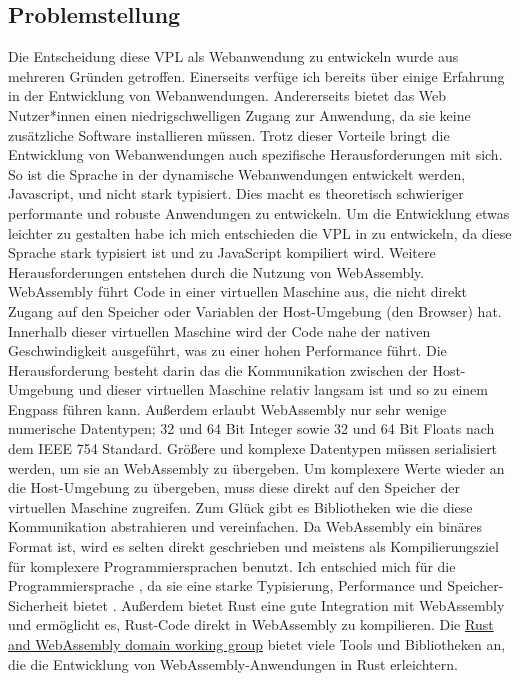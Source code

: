 \documentclass[ngerman]{article}
\begin{document}
\subsection{Problemstellung}

Die Entscheidung diese VPL als Webanwendung zu entwickeln wurde aus mehreren Gründen getroffen. 
Einerseits verfüge ich bereits über einige Erfahrung in der Entwicklung von Webanwendungen. 
Andererseits bietet das Web Nutzer*innen einen niedrigschwelligen Zugang zur Anwendung, da sie keine zusätzliche Software installieren müssen.
\linebreak
\linebreak
Trotz dieser Vorteile bringt die Entwicklung von Webanwendungen auch spezifische Herausforderungen mit sich.
So ist die Sprache in der dynamische Webanwendungen entwickelt werden, Javascript,  und nicht stark typisiert. 
Dies macht es theoretisch schwieriger performante und robuste Anwendungen zu entwickeln. 
Um die Entwicklung etwas leichter zu gestalten habe ich mich entschieden die VPL in  zu entwickeln, da diese Sprache stark typisiert ist und zu JavaScript kompiliert wird.
\linebreak
\linebreak
Weitere Herausforderungen entstehen durch die Nutzung von WebAssembly. 
WebAssembly führt Code in einer virtuellen Maschine aus, die nicht direkt Zugang auf den Speicher oder Variablen der Host-Umgebung (den Browser) hat.
Innerhalb dieser virtuellen Maschine wird der Code nahe der nativen Geschwindigkeit ausgeführt, was zu einer hohen Performance führt. 
Die Herausforderung besteht darin das die Kommunikation zwischen der Host-Umgebung und dieser virtuellen Maschine relativ langsam ist und so zu einem Engpass führen kann.
\linebreak
\linebreak
Außerdem erlaubt WebAssembly nur sehr wenige numerische Datentypen; 32 und 64 Bit Integer sowie 32 und 64 Bit Floats nach dem IEEE 754 Standard. 
Größere und komplexe Datentypen müssen serialisiert werden, um sie an WebAssembly zu übergeben. 
Um komplexere Werte wieder an die Host-Umgebung zu übergeben, muss diese direkt auf den Speicher der virtuellen Maschine zugreifen.
Zum Glück gibt es Bibliotheken wie  die diese Kommunikation abstrahieren und vereinfachen.
\linebreak
\linebreak
Da WebAssembly ein binäres Format ist, wird es selten direkt geschrieben und meistens als Kompilierungsziel für komplexere Programmiersprachen benutzt.
Ich entschied mich für die Programmiersprache , da sie eine starke Typisierung, Performance und Speicher-Sicherheit bietet \cite{bugden2022rust}.
Außerdem bietet Rust eine gute Integration mit WebAssembly und ermöglicht es, Rust-Code direkt in WebAssembly zu kompilieren. 
Die \href{https://rustwasm.github.io/}{Rust and WebAssembly domain working group} bietet viele Tools und Bibliotheken an, die die Entwicklung von WebAssembly-Anwendungen in Rust erleichtern.
\end{document}
